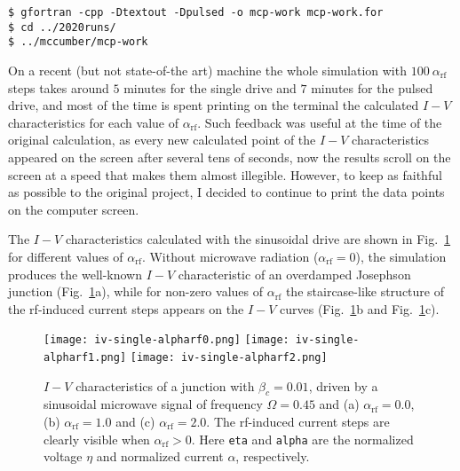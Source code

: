 \begin{verbatim}
$ gfortran -cpp -Dtextout -Dpulsed -o mcp-work mcp-work.for
$ cd ../2020runs/
$ ../mccumber/mcp-work
\end{verbatim}


On a recent (but not state-of-the art) machine the whole simulation with $100~\alpha_\mathrm{rf}$ steps takes around $5$ minutes for the single drive and $7$ minutes for the pulsed drive, and most of the time is spent printing on the terminal the calculated $I - V$ characteristics for each value of $\alpha_\mathrm{rf}$. Such feedback was useful at the time of the original calculation, as every new calculated point of the $I - V$ characteristics appeared on the screen after several tens of seconds, now the results scroll on the screen at a speed that makes them almost illegible.
However, to keep as faithful as possible to the original project, I decided to continue to print the data points on the computer screen.

The $I - V$ characteristics calculated with the sinusoidal drive are shown in Fig.~\ref{fig:iv-single} for different values of $\alpha_\mathrm{rf}$.
Without microwave radiation ($\alpha_\mathrm{rf} = 0$), the simulation produces the well-known $I - V$ characteristic of an overdamped Josephson junction (Fig.~\ref{fig:iv-single}a), while for non-zero values of $\alpha_\mathrm{rf}$ the staircase-like structure of the rf-induced current steps appears on the $I - V$ curves (Fig.~\ref{fig:iv-single}b and Fig.~\ref{fig:iv-single}c).

\begin{figure}[tb]
{
	\fboxsep=0pt
	\mbox{\texttt{[image: iv-single-alpharf0.png]}}
	\hfill
	\mbox{\texttt{[image: iv-single-alpharf1.png]}}
	\hfill
	\mbox{\texttt{[image: iv-single-alpharf2.png]}}
}
	\caption{$I - V$ characteristics of a junction with $\beta_c = 0.01$, driven by a sinusoidal microwave signal of frequency $\Omega = 0.45$ and (a) $\alpha_\mathrm{rf} = 0.0$, (b) $\alpha_\mathrm{rf} = 1.0$ and (c) $\alpha_\mathrm{rf} = 2.0$. The rf-induced current steps are clearly visible when $\alpha_\mathrm{rf} > 0$. Here \texttt{eta} and \texttt{alpha} are the normalized voltage $\eta$ and normalized current $\alpha$, respectively.}
	\label{fig:iv-single}
\end{figure}


